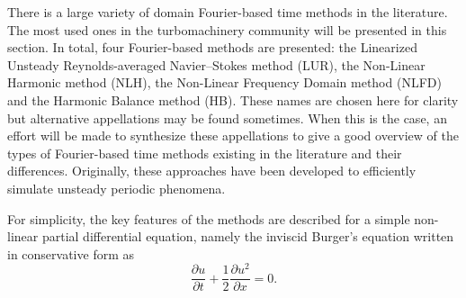 
There is a large variety of  domain Fourier-based time methods in the
literature. 
The most used ones in the turbomachinery community will be presented in this section.
In total, four Fourier-based methods are presented: 
the Linearized Unsteady Reynolds-averaged Navier--Stokes method (LUR), 
the Non-Linear Harmonic method (NLH), 
the Non-Linear Frequency Domain method (NLFD) 
and the Harmonic Balance method (HB).
These names are chosen here
for clarity but alternative appellations may be found sometimes. 
When this is the case, an effort will be made to synthesize
these appellations to give a good 
overview of the types of Fourier-based time methods existing in the literature
and their differences. Originally, these approaches have been developed
to efficiently simulate unsteady periodic phenomena.

For simplicity, the key features of the methods are described for
a simple non-linear partial differential equation, namely
the inviscid Burger's equation written in conservative form as
\begin{equation}
  \frac{\partial u}{\partial t} + 
  \frac{1}{2} \frac{\partial u^2}{\partial x} = 
  0.
  \label{eq:sm_nonlinear_convection_conservative}
\end{equation}
